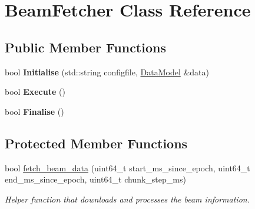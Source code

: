 \hypertarget{classBeamFetcher}{
\section{BeamFetcher Class Reference}
\label{classBeamFetcher}
}
\subsection*{Public Member Functions}
\begin{DoxyCompactItemize}
\item 
\hypertarget{classBeamFetcher_a575275aab7b03eb11cafd132fcce3015}{
bool {\bfseries Initialise} (std::string configfile, \hyperlink{classDataModel}{DataModel} \&data)}
\label{classBeamFetcher_a575275aab7b03eb11cafd132fcce3015}

\item 
\hypertarget{classBeamFetcher_afb3681ee1fbe9ea81c6268af05b90a5f}{
bool {\bfseries Execute} ()}
\label{classBeamFetcher_afb3681ee1fbe9ea81c6268af05b90a5f}

\item 
\hypertarget{classBeamFetcher_ae69fe473f0e6d24685eb9e234d97d172}{
bool {\bfseries Finalise} ()}
\label{classBeamFetcher_ae69fe473f0e6d24685eb9e234d97d172}

\end{DoxyCompactItemize}
\subsection*{Protected Member Functions}
\begin{DoxyCompactItemize}
\item 
\hypertarget{classBeamFetcher_a60c8d28364654bc042de262cacc94dcb}{
bool \hyperlink{classBeamFetcher_a60c8d28364654bc042de262cacc94dcb}{fetch\_\-beam\_\-data} (uint64\_\-t start\_\-ms\_\-since\_\-epoch, uint64\_\-t end\_\-ms\_\-since\_\-epoch, uint64\_\-t chunk\_\-step\_\-ms)}
\label{classBeamFetcher_a60c8d28364654bc042de262cacc94dcb}

\begin{DoxyCompactList}\small\item\em Helper function that downloads and processes the beam information. \item\end{DoxyCompactList}\end{DoxyCompactItemize}
